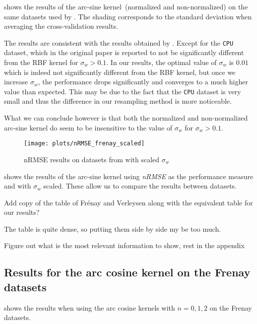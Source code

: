  shows the results of the arc-sine
kernel~(normalized and non-normalized) on the same datasets used by \textcite{frenayParameterinsensitiveKernelExtreme2011}. The shading corresponds to the standard deviation when averaging the
cross-validation results.

The results are consistent with the results obtained by \citeauthor{frenayParameterinsensitiveKernelExtreme2011}.
Except for the \texttt{CPU} dataset, which in the original paper is reported to
not be significantly different from the RBF kernel for $\sigma_w > 0.1$. In
our results, the optimal value of $\sigma_w$ is $0.01$ which is indeed not
significantly different from the RBF kernel, but once we increase $\sigma_w$,
the performance drops significantly and converges to a much higher value than
expected. This may be due to the fact that the \texttt{CPU} dataset is very
small and thus the difference in our resampling method is more noticeable.

What we can conclude however is that both the normalized and non-normalized
arc-sine kernel do seem to be insensitive to the value of $\sigma_w$ for
$\sigma_w > 0.1$.

\begin{figure}[H]
    \texttt{[image: plots/nRMSE\_frenay\_scaled]}
    \caption{nRMSE results on datasets from \cite{frenayParameterinsensitiveKernelExtreme2011} with
        scaled $\sigma_w$}%
    \label{fig:nrmse-frenay-scaled}
\end{figure}

 shows the results of the arc-sine kernel using
\emph{nRMSE} as the performance measure and with $\sigma_w$ scaled. These allow
us to compare the results between datasets.

\begin{cnote}
    Add copy of the table of Frénay and Verleysen along with the equivalent
    table for our results?

    The table is quite dense, so putting them side by side my be too much.

    Figure out what is the most relevant information to show, rest in the
    appendix
\end{cnote}

\subsection{Results for the arc cosine kernel on the Frenay datasets}

 shows the results when using the arc cosine kernels
with $n=0,1,2$ on the Frenay datasets.

